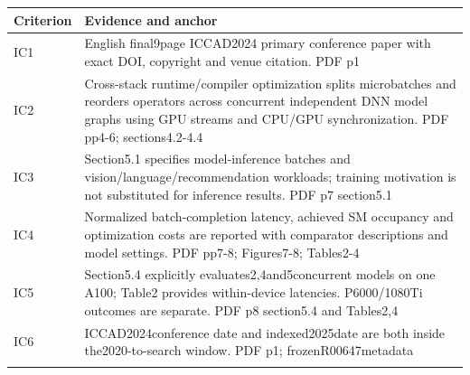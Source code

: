 \begin{longtable}{>{\raggedright\arraybackslash}p{}>{\raggedright\arraybackslash}p{}}
\toprule
\textbf{Criterion} & \textbf{Evidence and anchor}\\\midrule\endhead
IC1 & English final9page ICCAD2024 primary conference paper with exact DOI,\allowbreak{} copyright and venue citation. PDF p1\\\addlinespace
IC2 & Cross-stack runtime/compiler optimization splits microbatches and reorders operators across concurrent independent DNN model graphs using GPU streams and CPU/GPU synchronization. PDF pp4-6;\allowbreak{} sections4.2-4.4\\\addlinespace
IC3 & Section5.1 specifies model-inference batches and vision/language/recommendation workloads;\allowbreak{} training motivation is not substituted for inference results. PDF p7 section5.1\\\addlinespace
IC4 & Normalized batch-completion latency,\allowbreak{} achieved SM occupancy and optimization costs are reported with comparator descriptions and model settings. PDF pp7-8;\allowbreak{} Figures7-8;\allowbreak{} Tables2-4\\\addlinespace
IC5 & Section5.4 explicitly evaluates2,\allowbreak{}4and5concurrent models on one A100;\allowbreak{} Table2 provides within-device latencies. P6000/1080Ti outcomes are separate. PDF p8 section5.4 and Tables2,\allowbreak{}4\\\addlinespace
IC6 & ICCAD2024conference date and indexed2025date are both inside the2020-to-search window. PDF p1;\allowbreak{} frozenR00647metadata\\\addlinespace
\bottomrule\end{longtable}
